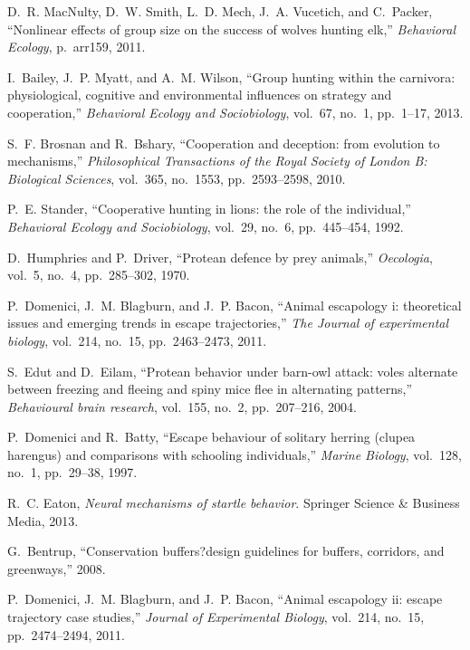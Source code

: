\documentclass[12pt,a4paper,final]{iopart}
\begin{document}
\begin{thebibliography}{10}
D.~R. MacNulty, D.~W. Smith, L.~D. Mech, J.~A. Vucetich, and C.~Packer,
``Nonlinear effects of group size on the success of wolves hunting elk,''
{\em Behavioral Ecology}, p.~arr159, 2011.


I.~Bailey, J.~P. Myatt, and A.~M. Wilson, ``Group hunting within the carnivora:
physiological, cognitive and environmental influences on strategy and
cooperation,'' {\em Behavioral Ecology and Sociobiology}, vol.~67, no.~1,
pp.~1--17, 2013.

S.~F. Brosnan and R.~Bshary, ``Cooperation and deception: from evolution to
mechanisms,'' {\em Philosophical Transactions of the Royal Society of London
B: Biological Sciences}, vol.~365, no.~1553, pp.~2593--2598, 2010.

P.~E. Stander, ``Cooperative hunting in lions: the role of the individual,''
{\em Behavioral Ecology and Sociobiology}, vol.~29, no.~6, pp.~445--454,
1992.

D.~Humphries and P.~Driver, ``Protean defence by prey animals,'' {\em
Oecologia}, vol.~5, no.~4, pp.~285--302, 1970.

P.~Domenici, J.~M. Blagburn, and J.~P. Bacon, ``Animal escapology i:
theoretical issues and emerging trends in escape trajectories,'' {\em The
Journal of experimental biology}, vol.~214, no.~15, pp.~2463--2473, 2011.

S.~Edut and D.~Eilam, ``Protean behavior under barn-owl attack: voles alternate
between freezing and fleeing and spiny mice flee in alternating patterns,''
{\em Behavioural brain research}, vol.~155, no.~2, pp.~207--216, 2004.

P.~Domenici and R.~Batty, ``Escape behaviour of solitary herring (clupea
harengus) and comparisons with schooling individuals,'' {\em Marine Biology},
vol.~128, no.~1, pp.~29--38, 1997.

R.~C. Eaton, {\em Neural mechanisms of startle behavior}.
\newblock Springer Science \& Business Media, 2013.

G.~Bentrup, ``Conservation buffers?design guidelines for buffers, corridors,
and greenways,'' 2008.

P.~Domenici, J.~M. Blagburn, and J.~P. Bacon, ``Animal escapology ii: escape
trajectory case studies,'' {\em Journal of Experimental Biology}, vol.~214,
no.~15, pp.~2474--2494, 2011.


\end{thebibliography}
\end{document}
